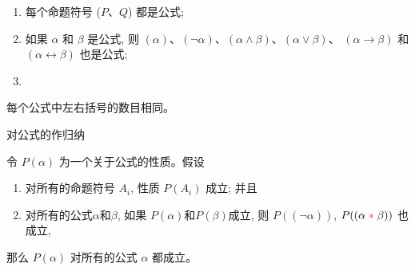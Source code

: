 \begin{frame}{}
  \begin{definition}[公式 (Formula)]
    \begin{enumerate}[(1)]
      \setlength{\itemsep}{8pt}
      \item 每个命题符号 ($P$、$Q$) 都是公式;
      \item 如果 $\alpha$ 和 $\beta$ 是公式,
        则 $(\alpha)$、$(\lnot \alpha)$、$(\alpha \land \beta)$、$(\alpha \lor \beta)$、
        $(\alpha \to \beta)$ 和 $(\alpha \leftrightarrow \beta)$ 也是公式;
      \item {}
    \end{enumerate}
  \end{definition}

  \pause
  \vspace{1em}
  \begin{lemma}[公式的括号匹配性质]
    每个公式中左右括号的数目相同。
  \end{lemma}

  \pause
  \vspace{0.20cm}
  \begin{center}

    \pause
    \vspace{0.50cm}
    {\large 对公式的作归纳}
  \end{center}
\end{frame}

\begin{frame}{}
  \begin{theorem}[关于公式的归纳原理]
    令 $P(\alpha)$ 为一个关于公式的性质。假设 \\[3pt]
    \begin{enumerate}[(1)]
      \setlength{\itemsep}{8pt}
      \item 对所有的命题符号 $A_{i}$, 性质 $P(A_{i})$ 成立; 并且
      \item 对所有的公式$\alpha$和$\beta$, 如果 $P(\alpha)$和$P(\beta)$成立,
        则 $P((\lnot \alpha))$, $P((\alpha \;\textcolor{red}{\ast}\; \beta))$ 也成立,
    \end{enumerate}
    那么 $P(\alpha)$ 对所有的公式 $\alpha$ 都成立。
  \end{theorem}
\end{frame}

